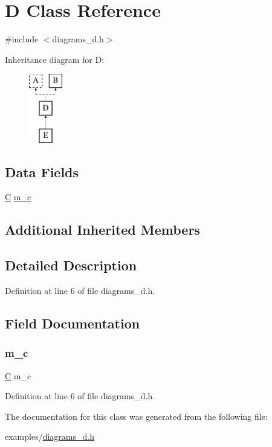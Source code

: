 \hypertarget{class_d}{}\section{D Class Reference}
\label{class_d}


{\ttfamily \#include $<$diagrams\+\_\+d.\+h$>$}

Inheritance diagram for D\+:\begin{figure}[H]
\begin{center}
\leavevmode
\includegraphics[height=3.000000cm]{class_d}
\end{center}
\end{figure}
\subsection*{Data Fields}
\begin{DoxyCompactItemize}
\item 
\hyperlink{class_c}{C} \hyperlink{class_d_a2c74ad44b86642512c21365372440c58}{m\+\_\+c}
\end{DoxyCompactItemize}
\subsection*{Additional Inherited Members}


\subsection{Detailed Description}


Definition at line 6 of file diagrams\+\_\+d.\+h.



\subsection{Field Documentation}
\mbox{\label{class_d_a2c74ad44b86642512c21365372440c58}} 
\subsubsection{\texorpdfstring{m\+\_\+c}{m\_c}}
{\footnotesize\ttfamily \hyperlink{class_c}{C} m\+\_\+c}



Definition at line 6 of file diagrams\+\_\+d.\+h.



The documentation for this class was generated from the following file\+:\begin{DoxyCompactItemize}
\item 
examples/\hyperlink{diagrams__d_8h}{diagrams\+\_\+d.\+h}\end{DoxyCompactItemize}
